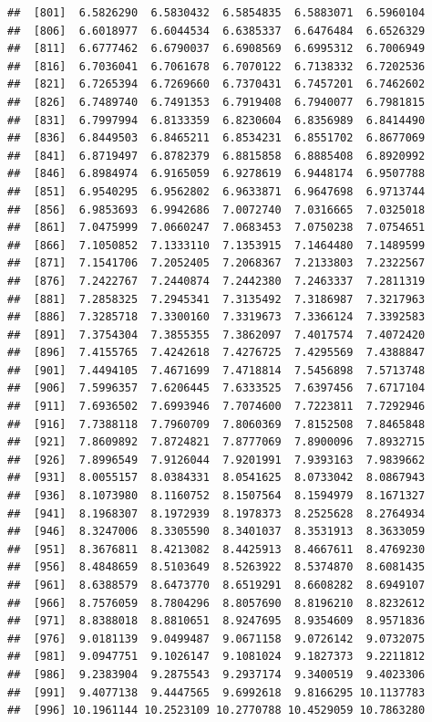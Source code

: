 \documentclass[
  11pt]{report}
\begin{document}
\begin{itemize}
\begin{verbatim}
##  [801]  6.5826290  6.5830432  6.5854835  6.5883071  6.5960104
##  [806]  6.6018977  6.6044534  6.6385337  6.6476484  6.6526329
##  [811]  6.6777462  6.6790037  6.6908569  6.6995312  6.7006949
##  [816]  6.7036041  6.7061678  6.7070122  6.7138332  6.7202536
##  [821]  6.7265394  6.7269660  6.7370431  6.7457201  6.7462602
##  [826]  6.7489740  6.7491353  6.7919408  6.7940077  6.7981815
##  [831]  6.7997994  6.8133359  6.8230604  6.8356989  6.8414490
##  [836]  6.8449503  6.8465211  6.8534231  6.8551702  6.8677069
##  [841]  6.8719497  6.8782379  6.8815858  6.8885408  6.8920992
##  [846]  6.8984974  6.9165059  6.9278619  6.9448174  6.9507788
##  [851]  6.9540295  6.9562802  6.9633871  6.9647698  6.9713744
##  [856]  6.9853693  6.9942686  7.0072740  7.0316665  7.0325018
##  [861]  7.0475999  7.0660247  7.0683453  7.0750238  7.0754651
##  [866]  7.1050852  7.1333110  7.1353915  7.1464480  7.1489599
##  [871]  7.1541706  7.2052405  7.2068367  7.2133803  7.2322567
##  [876]  7.2422767  7.2440874  7.2442380  7.2463337  7.2811319
##  [881]  7.2858325  7.2945341  7.3135492  7.3186987  7.3217963
##  [886]  7.3285718  7.3300160  7.3319673  7.3366124  7.3392583
##  [891]  7.3754304  7.3855355  7.3862097  7.4017574  7.4072420
##  [896]  7.4155765  7.4242618  7.4276725  7.4295569  7.4388847
##  [901]  7.4494105  7.4671699  7.4718814  7.5456898  7.5713748
##  [906]  7.5996357  7.6206445  7.6333525  7.6397456  7.6717104
##  [911]  7.6936502  7.6993946  7.7074600  7.7223811  7.7292946
##  [916]  7.7388118  7.7960709  7.8060369  7.8152508  7.8465848
##  [921]  7.8609892  7.8724821  7.8777069  7.8900096  7.8932715
##  [926]  7.8996549  7.9126044  7.9201991  7.9393163  7.9839662
##  [931]  8.0055157  8.0384331  8.0541625  8.0733042  8.0867943
##  [936]  8.1073980  8.1160752  8.1507564  8.1594979  8.1671327
##  [941]  8.1968307  8.1972939  8.1978373  8.2525628  8.2764934
##  [946]  8.3247006  8.3305590  8.3401037  8.3531913  8.3633059
##  [951]  8.3676811  8.4213082  8.4425913  8.4667611  8.4769230
##  [956]  8.4848659  8.5103649  8.5263922  8.5374870  8.6081435
##  [961]  8.6388579  8.6473770  8.6519291  8.6608282  8.6949107
##  [966]  8.7576059  8.7804296  8.8057690  8.8196210  8.8232612
##  [971]  8.8388018  8.8810651  8.9247695  8.9354609  8.9571836
##  [976]  9.0181139  9.0499487  9.0671158  9.0726142  9.0732075
##  [981]  9.0947751  9.1026147  9.1081024  9.1827373  9.2211812
##  [986]  9.2383904  9.2875543  9.2937174  9.3400519  9.4023306
##  [991]  9.4077138  9.4447565  9.6992618  9.8166295 10.1137783
##  [996] 10.1961144 10.2523109 10.2770788 10.4529059 10.7863280
\end{verbatim}


\end{itemize}
\end{document}
